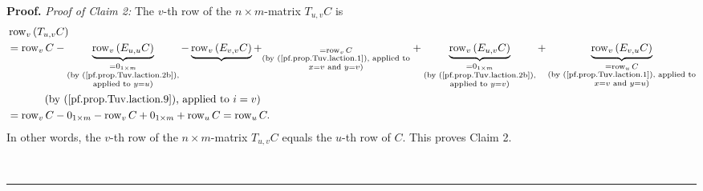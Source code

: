 \documentclass[numbers=enddot,12pt,final,onecolumn,notitlepage]{scrartcl}%
\theoremstyle{definition}
\newenvironment{proof}[1][Proof]{\noindent\textbf{#1.} }{\ \rule{0.5em}{0.5em}}
\begin{document}
\begin{proof}
\textit{Proof of Claim 2:} The $v$-th row of the $n\times m$-matrix $T_{u,v}C$
is%
\begin{align*}
&  \operatorname*{row}\nolimits_{v}\left(  T_{u,v}C\right) \\
&  =\operatorname*{row}\nolimits_{v}C-\underbrace{\operatorname*{row}%
\nolimits_{v}\left(  E_{u,u}C\right)  }_{\substack{=0_{1\times m}\\\text{(by
(\ref{pf.prop.Tuv.laction.2b}),}\\\text{applied to }y=u\text{)}}%
}-\underbrace{\operatorname*{row}\nolimits_{v}\left(  E_{v,v}C\right)
}+_{\substack{=\operatorname*{row}\nolimits_{v}C\\\text{(by
(\ref{pf.prop.Tuv.laction.1}), applied to}\\x=v\text{ and }y=v\text{)}%
}}+\underbrace{\operatorname*{row}\nolimits_{v}\left(  E_{u,v}C\right)
}_{\substack{=0_{1\times m}\\\text{(by (\ref{pf.prop.Tuv.laction.2b}%
),}\\\text{applied to }y=v\text{)}}}+\underbrace{\operatorname*{row}%
\nolimits_{v}\left(  E_{v,u}C\right)  }_{\substack{=\operatorname*{row}%
\nolimits_{u}C\\\text{(by (\ref{pf.prop.Tuv.laction.1}), applied
to}\\x=v\text{ and }y=u\text{)}}}\\
&  \ \ \ \ \ \ \ \ \ \ \left(  \text{by (\ref{pf.prop.Tuv.laction.9}), applied
to }i=v\right) \\
&  =\operatorname*{row}\nolimits_{v}C-0_{1\times m}-\operatorname*{row}%
\nolimits_{v}C+0_{1\times m}+\operatorname*{row}\nolimits_{u}%
C=\operatorname*{row}\nolimits_{u}C.
\end{align*}
In other words, the $v$-th row of the $n\times m$-matrix $T_{u,v}C$ equals the
$u$-th row of $C$. This proves Claim 2.


\end{proof}
\end{document}
